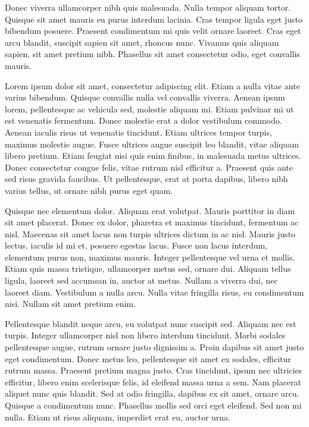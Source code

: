 \documentclass{novanarrative}
\begin{document}
Donec viverra ullamcorper nibh quis malesuada. Nulla tempor aliquam tortor. Quisque sit amet mauris eu purus interdum lacinia. Cras tempor ligula eget justo bibendum posuere. Praesent condimentum mi quis velit ornare laoreet. Cras eget arcu blandit, suscipit sapien sit amet, rhoncus nunc. Vivamus quis aliquam sapien, sit amet pretium nibh. Phasellus sit amet consectetur odio, eget convallis mauris.

Lorem ipsum dolor sit amet, consectetur adipiscing elit. Etiam a nulla vitae ante varius bibendum. Quisque convallis nulla vel convallis viverra. Aenean ipsum lorem, pellentesque ac vehicula sed, molestie aliquam mi. Etiam pulvinar mi ut est venenatis fermentum. Donec molestie erat a dolor vestibulum commodo. Aenean iaculis risus ut venenatis tincidunt. Etiam ultrices tempor turpis, maximus molestie augue. Fusce ultrices augue suscipit leo blandit, vitae aliquam libero pretium. Etiam feugiat nisi quis enim finibus, in malesuada metus ultrices. Donec consectetur congue felis, vitae rutrum nisl efficitur a. Praesent quis ante sed risus gravida faucibus. Ut pellentesque, erat at porta dapibus, libero nibh varius tellus, ut ornare nibh purus eget quam.

Quisque nec elementum dolor. Aliquam erat volutpat. Mauris porttitor in diam sit amet placerat. Donec ex dolor, pharetra et maximus tincidunt, fermentum ac nisl. Maecenas sit amet lacus non turpis ultrices dictum in ac nisl. Mauris justo lectus, iaculis id mi et, posuere egestas lacus. Fusce non lacus interdum, elementum purus non, maximus mauris. Integer pellentesque vel urna et mollis. Etiam quis massa tristique, ullamcorper metus sed, ornare dui. Aliquam tellus ligula, laoreet sed accumsan in, auctor at metus. Nullam a viverra dui, nec laoreet diam. Vestibulum a nulla arcu. Nulla vitae fringilla risus, eu condimentum nisi. Nullam sit amet pretium enim.

Pellentesque blandit neque arcu, eu volutpat nunc suscipit sed. Aliquam nec est turpis. Integer ullamcorper nisl non libero interdum tincidunt. Morbi sodales pellentesque augue, rutrum ornare justo dignissim a. Proin dapibus sit amet justo eget condimentum. Donec metus leo, pellentesque sit amet ex sodales, efficitur rutrum massa. Praesent pretium magna justo. Cras tincidunt, ipsum nec ultricies efficitur, libero enim scelerisque felis, id eleifend massa urna a sem. Nam placerat aliquet nunc quis blandit. Sed at odio fringilla, dapibus ex sit amet, ornare arcu. Quisque a condimentum nunc. Phasellus mollis sed orci eget eleifend. Sed non mi nulla. Etiam ut risus aliquam, imperdiet erat eu, auctor urna.
\end{document}

